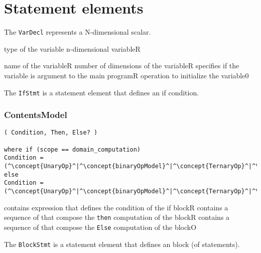 \section{Statement elements}


The {\tt VarDecl} represents a N-dimensional scalar.

\begin{HIRChildElements}
	{type of the variable n-dimensional variable}{R}
\end{HIRChildElements}

\begin{HIRAttributes}
	{name of the variable}{R}
	{number of dimensions of the variable}{R}
    {specifies if the variable is argument to the main program}{R}
	{operation to initialize the variable}{0}
\end{HIRAttributes}

The {\tt IfStmt} is a statement element that defines an if condition.

\subsubsection*{ContentsModel}{}

\begin{lstlisting}[style=default,frame=none]
( Condition, Then, Else? )

where if (scope == domain_computation)
Condition = (^\concept{UnaryOp}^|^\concept{binaryOpModel}^|^\concept{TernaryOp}^|^\concept{FieldAccess}^|^\concept{VarAccess}^|^\concept{Literal}^)
else
Condition = (^\concept{UnaryOp}^|^\concept{binaryOpModel}^|^\concept{TernaryOp}^|^\concept{VarAccess}^|^\concept{Literal}^)
\end{lstlisting}

\begin{HIRChildElements}
	{contains expression that defines the condition of the if block}{R}
	{contains a sequence of  that compose the {\tt then} 
	 computation of the block}{R}
	{contains a sequence of  that compose the {\tt Else} 
	 computation of the block}{O}
\end{HIRChildElements}

The {\tt BlockStmt} is a statement element that defines an block (of statements).

